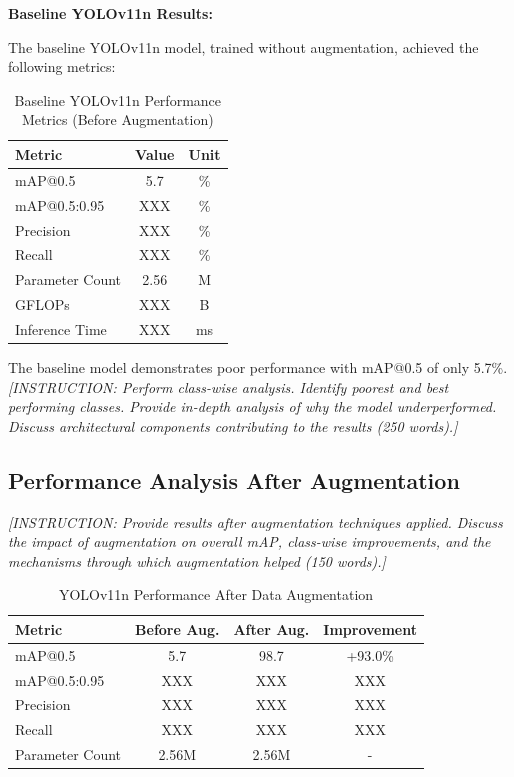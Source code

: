 \documentclass[11pt,a4paper]{article}
\begin{document}
\label{subsec:before_aug}

\textbf{Baseline YOLOv11n Results:}

The baseline YOLOv11n model, trained without augmentation, achieved the following metrics:

\begin{table}[H]
    \centering
    \caption{Baseline YOLOv11n Performance Metrics (Before Augmentation)}
    \label{tab:baseline_metrics}
    \begin{tabular}{|l|c|c|}
    \hline
    \textbf{Metric} & \textbf{Value} & \textbf{Unit} \\
    \hline
    mAP@0.5 & 5.7 & \% \\
    mAP@0.5:0.95 & XXX & \% \\
    Precision & XXX & \% \\
    Recall & XXX & \% \\
    Parameter Count & 2.56 & M \\
    GFLOPs & XXX & B \\
    Inference Time & XXX & ms \\
    \hline
    \end{tabular}
\end{table}

The baseline model demonstrates poor performance with mAP@0.5 of only 5.7\%. \textit{[INSTRUCTION: 
Perform class-wise analysis. Identify poorest and best performing classes. Provide in-depth analysis of 
why the model underperformed. Discuss architectural components contributing to the results (250 words).]}

\subsection{Performance Analysis After Augmentation}

\label{subsec:after_aug}

\textit{[INSTRUCTION: Provide results after augmentation techniques applied. Discuss the impact of 
augmentation on overall mAP, class-wise improvements, and the mechanisms through which augmentation 
helped (150 words).]}

\begin{table}[H]
    \centering
    \caption{YOLOv11n Performance After Data Augmentation}
    \label{tab:after_aug_metrics}
    \begin{tabular}{|l|c|c|c|}
    \hline
    \textbf{Metric} & \textbf{Before Aug.} & \textbf{After Aug.} & \textbf{Improvement} \\
    \hline
    mAP@0.5 & 5.7 & 98.7 & +93.0\% \\
    mAP@0.5:0.95 & XXX & XXX & XXX \\
    Precision & XXX & XXX & XXX \\
    Recall & XXX & XXX & XXX \\
    Parameter Count & 2.56M & 2.56M & - \\
    \hline
    \end{tabular}
\end{table}
\end{document}
